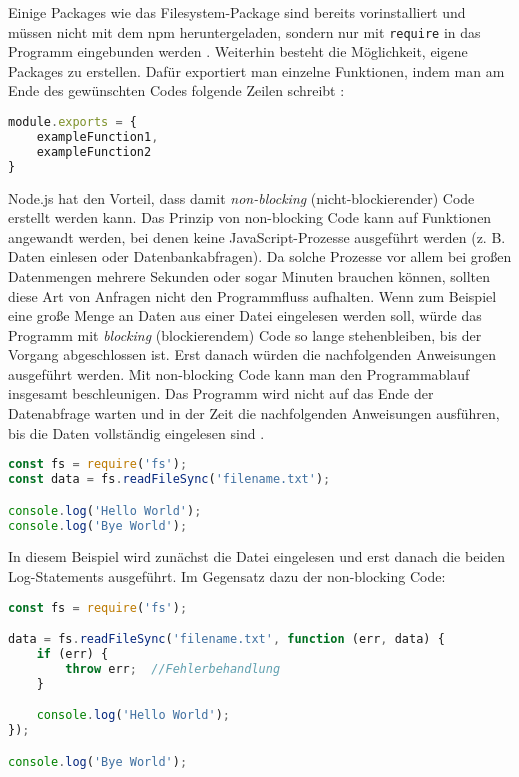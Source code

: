 Einige Packages wie das Filesystem-Package sind bereits vorinstalliert und müssen nicht mit dem \ac{npm} heruntergeladen, sondern nur mit \texttt{require} in das Programm eingebunden werden \cite{npm}.
Weiterhin besteht die Möglichkeit, eigene Packages zu erstellen. Dafür exportiert man einzelne Funktionen, indem man am Ende des gewünschten Codes folgende Zeilen schreibt \cite{npmm}: \\

\begin{lstlisting}[title=Beispiel für den Export von Funktionen, language=JavaScript]
module.exports = {
	exampleFunction1,
	exampleFunction2
}
\end{lstlisting}

Node.js hat den Vorteil, dass damit \textit{non-blocking} (nicht-blockierender) Code erstellt werden kann. Das Prinzip von non-blocking Code kann auf Funktionen angewandt werden, bei denen keine JavaScript-Prozesse ausgeführt werden (z. B. Daten einlesen oder Datenbankabfragen). Da solche Prozesse vor allem bei großen Datenmengen mehrere Sekunden oder sogar Minuten brauchen können, sollten diese Art von Anfragen nicht den Programmfluss aufhalten. Wenn zum Beispiel eine große Menge an Daten aus einer Datei eingelesen werden soll, würde das Programm mit \textit{blocking} (blockierendem) Code so lange stehenbleiben, bis der Vorgang abgeschlossen ist. Erst danach würden die nachfolgenden Anweisungen ausgeführt werden.
Mit non-blocking Code kann man den Programmablauf insgesamt beschleunigen. Das Programm wird nicht auf das Ende der Datenabfrage warten und in der Zeit die nachfolgenden Anweisungen ausführen, bis die Daten vollständig eingelesen sind \cite{njsbloc}. \\

 \begin{lstlisting}[title=Blocking Code bei dem Einlesen einer Datei, language=JavaScript]
const fs = require('fs');
const data = fs.readFileSync('filename.txt');

console.log('Hello World');
console.log('Bye World');
\end{lstlisting}

In diesem Beispiel wird zunächst die Datei eingelesen und erst danach die beiden Log-Statements ausgeführt. Im Gegensatz dazu der non-blocking Code: \\

\noindent
\begin{minipage}{\linewidth}
\begin{lstlisting}[title=Non-blocking Code beim Einlesen einer Datei, language=JavaScript]
const fs = require('fs');

data = fs.readFileSync('filename.txt', function (err, data) {
	if (err) {
		throw err;  //Fehlerbehandlung
	}

	console.log('Hello World');
});

console.log('Bye World');

\end{lstlisting}
\end{minipage}

